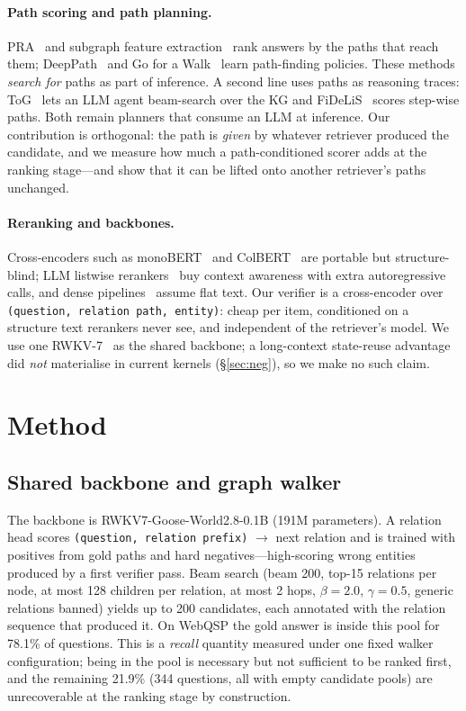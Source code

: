 \documentclass[sigconf,review]{acmart}
\begin{document}
\paragraph{Path scoring and path planning.}
PRA~\cite{lao2011pra} and subgraph feature extraction~\cite{gardner2015subgraph} rank answers by the paths that reach them; DeepPath~\cite{xiong2017deeppath} and Go for a Walk~\cite{das2018gowalk} learn path-finding policies. These methods \emph{search for} paths as part of inference. A second line uses paths as reasoning traces: ToG~\cite{sun2024tog} lets an LLM agent beam-search over the KG and FiDeLiS~\cite{sui2024fidelis} scores step-wise paths. Both remain planners that consume an LLM at inference. Our contribution is orthogonal: the path is \emph{given} by whatever retriever produced the candidate, and we measure how much a path-conditioned scorer adds at the ranking stage---and show that it can be lifted onto another retriever's paths unchanged.

\paragraph{Reranking and backbones.}
Cross-encoders such as monoBERT~\cite{nogueira2019passage} and ColBERT~\cite{khattab2020colbert} are portable but structure-blind; LLM listwise rerankers~\cite{sun2023rankgpt} buy context awareness with extra autoregressive calls, and dense pipelines~\cite{karpukhin2020dpr} assume flat text. Our verifier is a cross-encoder over \texttt{(question, relation path, entity)}: cheap per item, conditioned on a structure text rerankers never see, and independent of the retriever's model. We use one RWKV-7~\cite{peng2023rwkv,peng2025rwkv7} as the shared backbone; a long-context state-reuse advantage did \emph{not} materialise in current kernels (\S\ref{sec:neg}), so we make no such claim.

\section{Method}
\label{sec:method}

\subsection{Shared backbone and graph walker}
\label{sec:walker}
The backbone is RWKV7-Goose-World2.8-0.1B (191M parameters). A relation head scores \texttt{(question, relation prefix)} $\rightarrow$ next relation and is trained with positives from gold paths and hard negatives---high-scoring wrong entities produced by a first verifier pass. Beam search (beam 200, top-15 relations per node, at most 128 children per relation, at most 2 hops, $\beta=2.0$, $\gamma=0.5$, generic relations banned) yields up to 200 candidates, each annotated with the relation sequence that produced it. On WebQSP the gold answer is inside this pool for 78.1\% of questions. This is a \emph{recall} quantity measured under one fixed walker configuration; being in the pool is necessary but not sufficient to be ranked first, and the remaining 21.9\% (344 questions, all with empty candidate pools) are unrecoverable at the ranking stage by construction.
\end{document}

